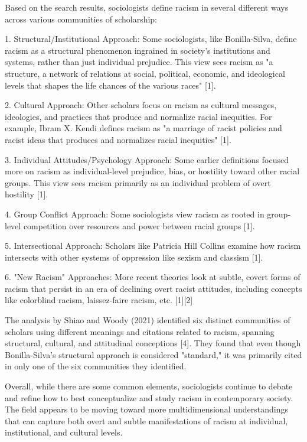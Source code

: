 {{Based on the search results, sociologists define racism in several different ways across various communities of scholarship:

1. Structural/Institutional Approach:
Some sociologists, like Bonilla-Silva, define racism as a structural phenomenon ingrained in society's institutions and systems, rather than just individual prejudice. This view sees racism as "a structure, a network of relations at social, political, economic, and ideological levels that shapes the life chances of the various races" [1].

2. Cultural Approach: 
Other scholars focus on racism as cultural messages, ideologies, and practices that produce and normalize racial inequities. For example, Ibram X. Kendi defines racism as "a marriage of racist policies and racist ideas that produces and normalizes racial inequities" [1].

3. Individual Attitudes/Psychology Approach:
Some earlier definitions focused more on racism as individual-level prejudice, bias, or hostility toward other racial groups. This view sees racism primarily as an individual problem of overt hostility [1].

4. Group Conflict Approach:
Some sociologists view racism as rooted in group-level competition over resources and power between racial groups [1].

5. Intersectional Approach: 
Scholars like Patricia Hill Collins examine how racism intersects with other systems of oppression like sexism and classism [1].

6. "New Racism" Approaches:
More recent theories look at subtle, covert forms of racism that persist in an era of declining overt racist attitudes, including concepts like colorblind racism, laissez-faire racism, etc. [1][2]

The analysis by Shiao and Woody (2021) identified six distinct communities of scholars using different meanings and citations related to racism, spanning structural, cultural, and attitudinal conceptions [4]. They found that even though Bonilla-Silva's structural approach is considered "standard," it was primarily cited in only one of the six communities they identified.

Overall, while there are some common elements, sociologists continue to debate and refine how to best conceptualize and study racism in contemporary society. The field appears to be moving toward more multidimensional understandings that can capture both overt and subtle manifestations of racism at individual, institutional, and cultural levels.

}}
